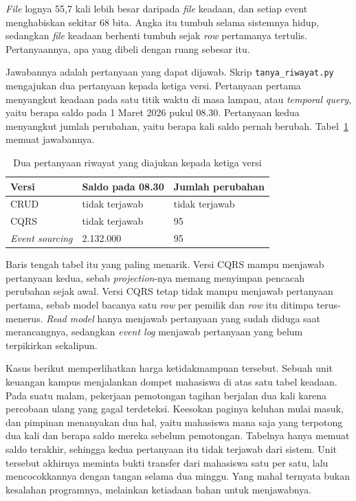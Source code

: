 \textit{File} lognya 55,7 kali lebih besar daripada \textit{file} keadaan, dan setiap
event menghabiskan sekitar 68 bita. Angka itu tumbuh selama sistemnya
hidup, sedangkan \textit{file} keadaan berhenti tumbuh sejak \textit{row} pertamanya
tertulis. Pertanyaannya, apa yang dibeli dengan ruang sebesar itu.

Jawabannya adalah pertanyaan yang dapat dijawab. Skrip
\texttt{tanya\_riwayat.py} mengajukan dua pertanyaan kepada ketiga versi.
Pertanyaan pertama menyangkut keadaan pada satu titik waktu di masa lampau,
atau \textit{temporal query}, yaitu berapa
saldo pada 1 Maret 2026 pukul 08.30.
Pertanyaan kedua menyangkut jumlah perubahan, yaitu berapa kali saldo pernah
berubah. Tabel~\ref{tab:pertanyaan} memuat jawabannya.

\begin{table}[htbp]
  \centering
  \caption{Dua pertanyaan riwayat yang diajukan kepada ketiga versi}
  \label{tab:pertanyaan}
  \begin{tabularx}{\textwidth}{|l|X|X|}
    \hline
    \textbf{Versi} & \textbf{Saldo pada 08.30} & \textbf{Jumlah perubahan} \\
    \hline
    CRUD & tidak terjawab & tidak terjawab \\
    \hline
    CQRS & tidak terjawab & 95 \\
    \hline
    \textit{Event sourcing} & 2.132.000 & 95 \\
    \hline
  \end{tabularx}
\end{table}

Baris tengah tabel itu yang paling menarik. Versi CQRS mampu menjawab
pertanyaan kedua, sebab \textit{projection}-nya memang menyimpan pencacah perubahan sejak
awal. Versi CQRS tetap tidak mampu menjawab pertanyaan pertama, sebab model
bacanya satu \textit{row} per pemilik dan \textit{row} itu ditimpa terus-menerus. \textit{Read model}
hanya menjawab pertanyaan yang sudah diduga saat merancangnya, sedangkan
\textit{event log} menjawab pertanyaan yang belum terpikirkan sekalipun.

Kasus berikut memperlihatkan harga ketidakmampuan tersebut. Sebuah unit
keuangan kampus menjalankan dompet mahasiswa di atas satu tabel keadaan. Pada
suatu malam, pekerjaan pemotongan tagihan berjalan dua kali karena percobaan
ulang yang gagal terdeteksi. Keesokan paginya keluhan mulai masuk, dan
pimpinan menanyakan dua hal, yaitu mahasiswa mana saja yang terpotong dua kali
dan berapa saldo mereka sebelum pemotongan. Tabelnya hanya memuat saldo
terakhir, sehingga kedua pertanyaan itu tidak terjawab dari sistem. Unit
tersebut akhirnya meminta bukti transfer dari mahasiswa satu per satu, lalu
mencocokkannya dengan tangan selama dua minggu. Yang mahal ternyata bukan
kesalahan programnya, melainkan ketiadaan bahan untuk menjawabnya.

